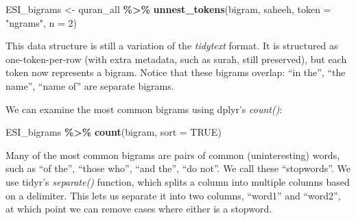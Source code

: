 \documentclass[
]{article}
\newenvironment{Shaded}{\begin{snugshade}}{\end{snugshade}}
\newcommand{\AttributeTok}[1]{\textcolor[rgb]{0.13,0.29,0.53}{#1}}
\newcommand{\ConstantTok}[1]{\textcolor[rgb]{0.56,0.35,0.01}{#1}}
\newcommand{\DecValTok}[1]{\textcolor[rgb]{0.00,0.00,0.81}{#1}}
\newcommand{\FunctionTok}[1]{\textcolor[rgb]{0.13,0.29,0.53}{\textbf{#1}}}
\newcommand{\NormalTok}[1]{#1}
\newcommand{\OtherTok}[1]{\textcolor[rgb]{0.56,0.35,0.01}{#1}}
\newcommand{\SpecialCharTok}[1]{\textcolor[rgb]{0.81,0.36,0.00}{\textbf{#1}}}
\newcommand{\StringTok}[1]{\textcolor[rgb]{0.31,0.60,0.02}{#1}}
\begin{document}
\footnotesize

\begin{Shaded}
\begin{Highlighting}[]
\NormalTok{ESI\_bigrams }\OtherTok{\textless{}{-}}\NormalTok{ quran\_all }\SpecialCharTok{\%\textgreater{}\%}
  \FunctionTok{unnest\_tokens}\NormalTok{(bigram, saheeh, }\AttributeTok{token =} \StringTok{"ngrams"}\NormalTok{, }\AttributeTok{n =} \DecValTok{2}\NormalTok{)}
\end{Highlighting}
\end{Shaded}

\normalsize

This data structure is still a variation of the \emph{tidytext} format. It is structured as one-token-per-row (with extra metadata, such as surah, still preserved), but each token now represents a bigram. Notice that these bigrams overlap: ``in the'', ``the name'', ``name of'' are separate bigrams.

We can examine the most common bigrams using dplyr's \emph{count()}:

\footnotesize

\begin{Shaded}
\begin{Highlighting}[]
\NormalTok{ESI\_bigrams }\SpecialCharTok{\%\textgreater{}\%}
  \FunctionTok{count}\NormalTok{(bigram, }\AttributeTok{sort =} \ConstantTok{TRUE}\NormalTok{)}
\end{Highlighting}
\end{Shaded}

\normalsize

Many of the most common bigrams are pairs of common (uninteresting) words, such as ``of the'', ``those who'', ``and the'', ``do not''. We call these ``stopwords''. We use tidyr's \emph{separate()} function, which splits a column into multiple columns based on a delimiter. This lets us separate it into two columns, ``word1'' and ``word2'', at which point we can remove cases where either is a stopword.

\footnotesize
\end{document}
